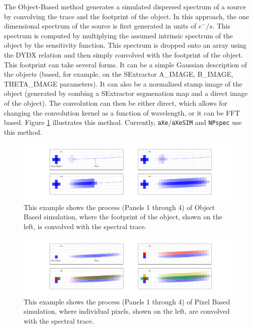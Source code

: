 \documentclass[preprint]{aastex}
\begin{document}
The Object-Based method generates a simulated dispersed spectrum of a source by convolving the trace and the footprint of the object. In this approach, the one dimensional spectrum of the source is first generated in units of $e^-/s$. This spectrum is computed by multiplying the assumed intrinsic spectrum of the object by the sensitivity function. This spectrum is dropped onto an array using the DYDX relation and then simply convolved with the footprint of the object. This footprint can take several forms. It can be a simple Gaussian description of the objects (based, for example, on the SExtractor A\_IMAGE, B\_IMAGE, THETA\_IMAGE parameters). It can also be a normalized stamp image of the object (generated by combing a SExtractor segmenation map and a direct image of the object). The convolution can then be either direct, which allows for changing the convolution kernel as a function of wavelength, or it can be FFT based.
Figure \ref{sim:1} illustrates this method. Currently, \texttt{aXe}/\texttt{aXeSIM} and \texttt{NPspec} use this method. 

\begin{figure}[!t]
\centering
\includegraphics[width=\textwidth]{"Figures/object_sim"}
\caption{This example shows the process (Panels 1 through 4) of Object Based simulation, where the footprint of the object, shown on the left, is convolved with the spectral trace.}
\label{sim:1}
\end{figure}

\begin{figure}[!t]
\centering
\includegraphics[width=\textwidth]{"Figures/pixel_sim"}
\caption{This example shows the process (Panels 1 through 4) of Pixel Based simulation, where individual pixels, shown on the left, are convolved with the spectral trace.}
\label{sim:2}
\end{figure}
\end{document}
